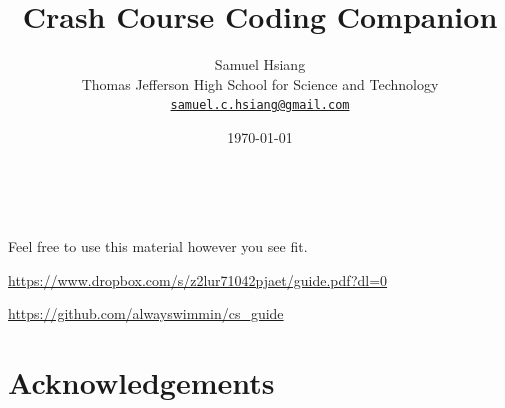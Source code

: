 \documentclass[11pt]{book}
\begin{document}
\frontmatter

\title{Crash Course Coding Companion}
\author{Samuel Hsiang \\ Thomas Jefferson High School for Science and Technology \\ \href{mailto:samuel.c.hsiang@gmail.com}{\texttt{\textup{samuel.c.hsiang@gmail.com}}} }
\date{\today}

\maketitle

\newpage
~\vfill
\thispagestyle{empty}


\noindent Feel free to use this material however you see fit.



\noindent \url{https://www.dropbox.com/s/z2lur71042pjaet/guide.pdf?dl=0}

\noindent \url{https://github.com/alwayswimmin/cs_guide}



\newpage
\thispagestyle{empty}
\par\vspace*{.35\textheight}{\centering For Rachel \par}

\chapter{Acknowledgements}
\end{document}
